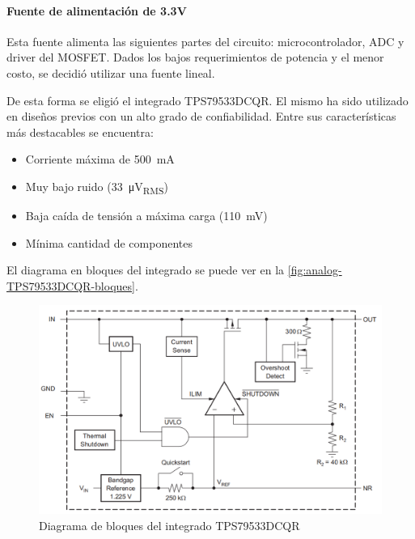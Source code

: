 \documentclass[titlepage, 12pt]{article}
\begin{document}
      \paragraph{Fuente de alimentación de 3.3V}
      Esta fuente alimenta las siguientes partes del circuito: microcontrolador, ADC y driver del MOSFET. Dados los bajos requerimientos de potencia y el menor costo, se decidió utilizar una fuente lineal.

      De esta forma se eligió el integrado TPS79533DCQR. El mismo ha sido utilizado en diseños previos con un alto grado de confiabilidad. Entre sus características más destacables se encuentra:

          \begin{itemize}
              \item Corriente máxima de \SI{500}{mA}
              \item Muy bajo ruido (\SI{33}{\micro V_{RMS}})
              \item Baja caída de tensión a máxima carga (\SI{110}{mV})
              \item Mínima cantidad de componentes
          \end{itemize}

      El diagrama en bloques del integrado se puede ver en la \autoref{fig:analog-TPS79533DCQR-bloques}.

          \begin{figure}[!htbp]
              \centering
              \includegraphics[scale=0.5]{images/analog-TPS79533DCQR-bloques.png}
              \caption{Diagrama de bloques del integrado TPS79533DCQR}
              \label{fig:analog-TPS79533DCQR-bloques}
          \end{figure}
\end{document}
